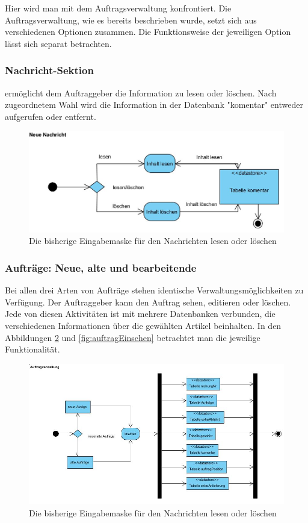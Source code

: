 Hier wird man mit dem Auftragsverwaltung konfrontiert. Die Auftragsverwaltung, wie es bereits beschrieben wurde, setzt sich aus verschiedenen Optionen zusammen. Die Funktionsweise der jeweiligen Option lässt sich separat betrachten. 
	
\subsubsection{Nachricht-Sektion} ermöglicht dem Auftraggeber die Information zu lesen oder löschen. Nach zugeordnetem Wahl wird die Information in der Datenbank "komentar" entweder aufgerufen oder entfernt. 

\begin{figure}[h]
	\centering
	\includegraphics[width=0.8\linewidth]{Graphics/NeueNachricht.JPG}
	\caption[Kommunikation]{Die bisherige Eingabemaske für den Nachrichten lesen oder löschen}
	\label{fig:Kommunikation}
\end{figure}



\subsubsection{Aufträge: Neue, alte und bearbeitende}

Bei allen drei Arten von Aufträge stehen identische Verwaltungsmöglichkeiten zu Verfügung. Der Auftraggeber kann den Auftrag sehen, editieren oder löschen. Jede von diesen Aktivitäten ist mit mehrere Datenbanken verbunden, die verschiedenen Informationen über die gewählten Artikel beinhalten. In den Abbildungen \ref{fig:Autrag_Loeschen} und \ref{fig:auftragEinsehen} betrachtet man die jeweilige Funktionalität.


\begin{figure}[h]
	\centering
	\includegraphics[width=1\linewidth]{Graphics/Autrag_Loeschen.JPG}
	\caption[AutragLoeschen]{Die bisherige Eingabemaske für den Nachrichten lesen oder löschen}
	\label{fig:Autrag_Loeschen}
\end{figure}
 
